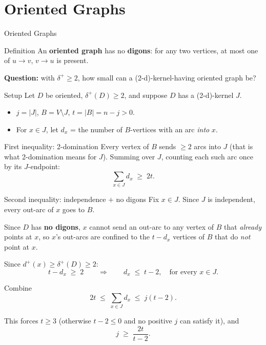 \documentclass[11pt]{beamer}
\begin{document}
\section{Oriented Graphs}

\begin{frame}{Oriented Graphs}
  \begin{block}{Definition}
    An \textbf{oriented graph} has no \textbf{digons}: for any two vertices, at
    most one of $u \to v$, $v \to u$ is present.
  \end{block}
  \bigskip
  \textbf{Question:} with $\delta^+ \ge 2$, how small can a
  (2-d)-kernel-having oriented graph be?
\end{frame}

\begin{frame}{Setup}
  Let $D$ be oriented, $\delta^+(D) \ge 2$, and suppose $D$ has a (2-d)-kernel $J$.

  \bigskip
  \begin{itemize}
    \item $j = |J|$, $B = V \setminus J$, $t = |B| = n - j > 0$.
    \item For $x \in J$, let $d_x$ = the number of $B$-vertices with an arc
          \emph{into} $x$.
  \end{itemize}
\end{frame}

\begin{frame}{First inequality: 2-domination}
  Every vertex of $B$ sends $\ge 2$ arcs into $J$ (that is what 2-domination
  means for $J$). Summing over $J$, counting each such arc once by its
  $J$-endpoint:
  \[
    \sum_{x \in J} d_x \;\ge\; 2t.
  \]
\end{frame}

\begin{frame}{Second inequality: independence $+$ no digons}
  Fix $x \in J$. Since $J$ is independent, every out-arc of $x$ goes to $B$.

  \bigskip
  Since $D$ has \textbf{no digons}, $x$ cannot send an out-arc to any vertex of
  $B$ that \emph{already} points at $x$, so $x$'s out-arcs are confined to
  the $t - d_x$ vertices of $B$ that do \emph{not} point at $x$.

  \bigskip
  Since $d^+(x) \ge \delta^+(D) \ge 2$:
  \[
    t - d_x \;\ge\; 2 \qquad\Longrightarrow\qquad d_x \;\le\; t - 2, \quad \text{for every } x \in J.
  \]
\end{frame}

\begin{frame}{Combine}
  \[
    2t \;\le\; \sum_{x \in J} d_x \;\le\; j(t-2).
  \]

  \bigskip
  This forces $t \ge 3$ (otherwise $t - 2 \le 0$ and no positive $j$ can
  satisfy it), and
  \[
    j \;\ge\; \frac{2t}{t-2}.
  \]
\end{frame}
\end{document}
